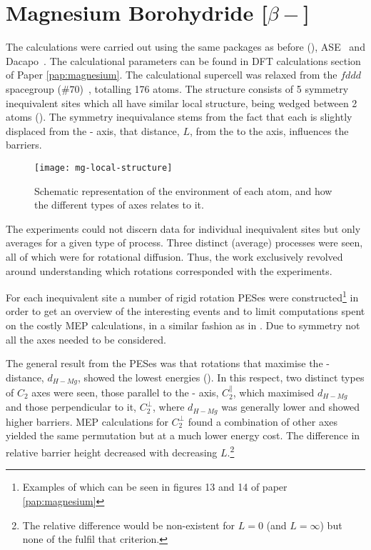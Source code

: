 \section{Magnesium Borohydride [$\beta-$]}
\label{sec:borohydrides-magnesium}
The calculations were carried out using the same packages as before (), ASE~\cite{ase-2002} and Dacapo~\cite{dacapo-1999}.
The calculational parameters can be found in DFT calculations section of Paper \ref{pap:magnesium}.
The calculational supercell was relaxed from the $fddd$ spacegroup ($\#70$)~\cite{mgbh42-structure-fddd}, totalling 176 atoms.
The structure consists of 5 symmetry inequivalent  sites which all have similar local structure, being wedged between 2  atoms ().
The symmetry inequivalance stems from the fact that each  is slightly displaced from the - axis, that distance, $L$, from the  to the axis, influences the barriers.

\begin{figure}[htb]
\begin{minipage}{1.0\textwidth}
\begin{center}
    \texttt{[image: mg-local-structure]}
    \parbox{0.85\linewidth}{
\caption{
Schematic representation of the environment of each  atom, and how the different types of axes relates to it.
}
\label{fig:mg-local-structure}
}
\end{center}
\end{minipage}
\end{figure}

The experiments could not discern data for individual inequivalent sites but only averages for a given type of process.
Three distinct (average) processes were seen, all of which were for rotational diffusion.
Thus, the work exclusively revolved around understanding which rotations corresponded with the experiments.

For each inequivalent site a number of rigid rotation PESes were constructed\footnote{Examples of which can be seen in figures 13 and 14 of paper \ref{pap:magnesium}} in order to get an overview of the interesting events and to limit computations spent on the costly MEP calculations, in a similar fashion as in .
Due to symmetry not all the axes needed to be considered.

The general result from the PESes was that rotations that maximise the - distance, $d_{H-Mg}$, showed the lowest energies ().
In this respect, two distinct types of $C_2$ axes were seen, those parallel to the - axis, $C_2^\parallel$, which maximised $d_{H-Mg}$ and those perpendicular to it, $C_2^\perp$, where $d_{H-Mg}$ was generally lower and showed higher barriers.
MEP calculations for $C_2^\perp$ found a combination of other axes yielded the same permutation but at a much lower energy cost.
The difference in relative barrier height decreased with decreasing $L$.\footnote{The relative difference would be non-existent for $L=0$ (and $L=\infty$) but none of the  fulfil that criterion.}

